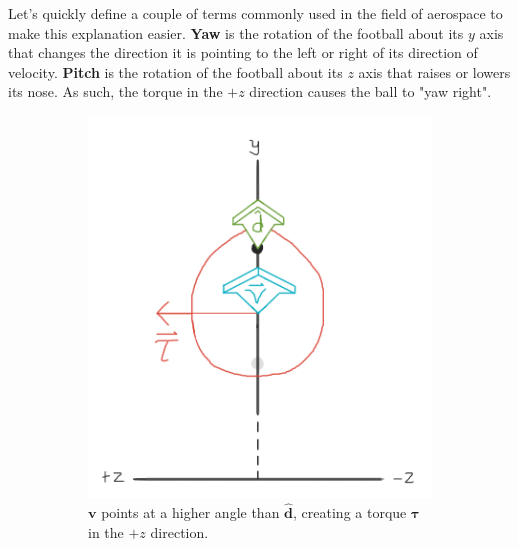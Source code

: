 \documentclass{article}
\begin{document}
Let's quickly define a couple of terms commonly used in the field of aerospace to make this explanation easier. \textbf{Yaw} is the rotation of the football about its $y$ axis that changes the direction it is pointing to the left or right of its direction of velocity. \textbf{Pitch} is the rotation of the football about its $z$ axis that raises or lowers its nose. As such, the torque in the $+z$ direction causes the ball to "yaw right".

\begin{figure}[h]
     \begin{subfigure}[b]{0.3\textwidth}
         \includegraphics[width=\textwidth]{img/precession (1).png}
         \caption{$\mathbf{v}$ points at a higher angle than $\mathbf{\hat{d}}$, creating a torque $\pmb{\tau}$ in the $+z$ direction.}
         \label{precession1}
     \end{subfigure}
     \hfill
     \begin{subfigure}[b]{0.3\textwidth}

\end{subfigure}
\end{figure}
\end{document}
